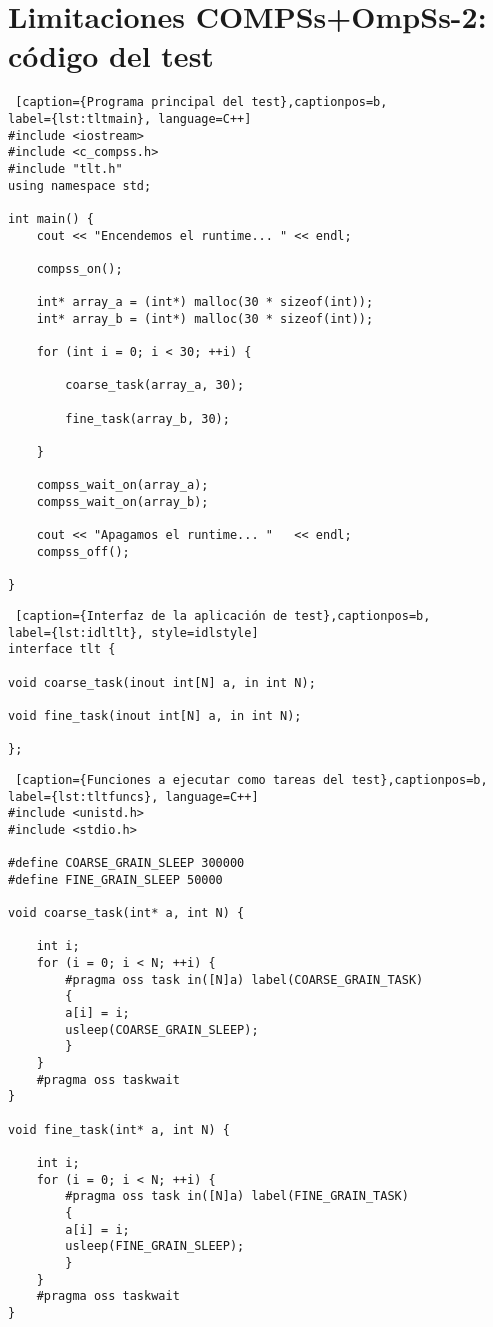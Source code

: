 \chapter{Limitaciones COMPSs+OmpSs-2: código del test}
\label{appendix:estudioprevio}

\begin{minipage}{\linewidth}
\begin{lstlisting} [caption={Programa principal del test},captionpos=b, 
label={lst:tltmain}, language=C++]
#include <iostream>
#include <c_compss.h>
#include "tlt.h"
using namespace std;

int main() {
	cout << "Encendemos el runtime... " << endl;

	compss_on();
	
	int* array_a = (int*) malloc(30 * sizeof(int));
	int* array_b = (int*) malloc(30 * sizeof(int));
	
	for (int i = 0; i < 30; ++i) {
	
		coarse_task(array_a, 30);
		
		fine_task(array_b, 30);
	
	}
	
	compss_wait_on(array_a);
	compss_wait_on(array_b);   
		
	cout << "Apagamos el runtime... "   << endl;
	compss_off();

}   
\end{lstlisting}
\end{minipage}

\begin{minipage}{\linewidth}
\begin{lstlisting} [caption={Interfaz de la aplicación de test},captionpos=b, 
label={lst:idltlt}, style=idlstyle] 
interface tlt {

void coarse_task(inout int[N] a, in int N);

void fine_task(inout int[N] a, in int N);

};
\end{lstlisting}
\end{minipage}

\newpage

\begin{minipage}{\linewidth}
\begin{lstlisting} [caption={Funciones a ejecutar como tareas del test},captionpos=b,
label={lst:tltfuncs}, language=C++] 
#include <unistd.h>
#include <stdio.h>

#define COARSE_GRAIN_SLEEP 300000
#define FINE_GRAIN_SLEEP 50000

void coarse_task(int* a, int N) {
	
	int i;
	for (i = 0; i < N; ++i) {
		#pragma oss task in([N]a) label(COARSE_GRAIN_TASK) 
		{
		a[i] = i;
		usleep(COARSE_GRAIN_SLEEP);
		}
	}
	#pragma oss taskwait
}

void fine_task(int* a, int N) {
	
	int i;
	for (i = 0; i < N; ++i) {
		#pragma oss task in([N]a) label(FINE_GRAIN_TASK)
		{
		a[i] = i;
		usleep(FINE_GRAIN_SLEEP);
		}
	} 
	#pragma oss taskwait
}  
\end{lstlisting}
\end{minipage}